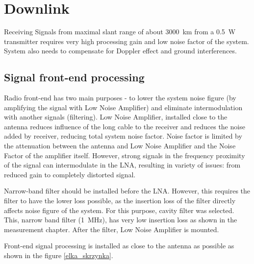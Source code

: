 
\section{Downlink}
Receiving Signals from maximal slant range of about \SI{3000}{\kilo\meter} from a \SI{0.5}{\watt} transmitter requires very high processing gain and low noise factor of the system. System also needs to compensate for Doppler effect and ground interferences.

\subsection{Signal front-end processing}
Radio front-end has two main purposes - to lower the system noise figure (by amplifying the signal with Low Noise Amplifier) and eliminate intermodulation with another signals (filtering). Low Noise Amplifier, installed close to the antenna reduces influence of the long cable to the receiver and reduces the noise added by receiver, reducing total system noise factor. Noise factor is limited by the attenuation between the antenna and Low Noise Amplifier and the Noise Factor of the amplifier itself. However, strong signals in the frequency proximity of the signal can intermodulate in the LNA, resulting in variety of issues: from reduced gain to completely distorted signal.

Narrow-band filter should be installed before the LNA. However, this requires the filter to have the lower loss possible, as the insertion loss of the filter directly affects noise figure of the system. For this purpose, cavity filter was selected. This, narrow band filter (\SI{1}{\MHz}), has very low insertion loss as shown in the measurement chapter. After the filter, Low Noise Amplifier is mounted.

Front-end signal processing is installed as close to the antenna as possible as shown in the figure \ref{elka_skrzynka}.

